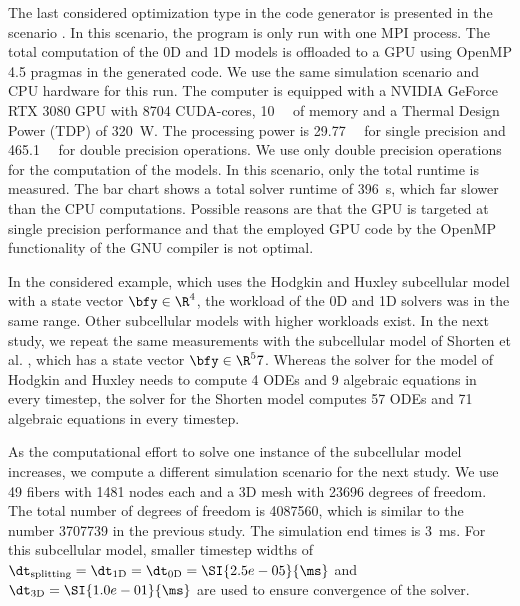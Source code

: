 The last considered optimization type in the code generator is presented in the scenario . In this scenario, the program is only run with one MPI process. The total computation of the 0D and 1D models is offloaded to a GPU using OpenMP 4.5 pragmas in the generated code. We use the same simulation scenario and CPU hardware for this run. The computer is equipped with a NVIDIA GeForce RTX 3080 GPU with 8704 CUDA-cores, \SI{10}{\giga\byte} of memory and a Thermal Design Power (TDP) of \SI{320}{\watt}. The processing power is \SI{29.77}{\tera\flops} for single precision and \SI{465.1}{\giga\flops} for double precision operations. We use only double precision operations for the computation of the models.
In this scenario, only the total runtime is measured. The bar chart shows a total solver runtime of \SI{396}{\s}, which far slower than the CPU computations. Possible reasons are that the GPU is targeted at single precision performance and that the employed GPU code by the OpenMP functionality of the GNU compiler is not optimal.

In the considered example, which uses the Hodgkin and Huxley subcellular model with a state vector $\bfy \in \R^4$, the workload of the 0D and 1D solvers was in the same range. Other subcellular models with higher workloads exist. In the next study, we repeat the same measurements with the subcellular model of Shorten et al. \cite{shorten2007mathematical}, which has a state vector $\bfy \in \R^57$.  Whereas the solver for the model of Hodgkin and Huxley needs to compute 4 ODEs and 9 algebraic equations in every timestep, the solver for the Shorten model computes 57 ODEs and 71 algebraic equations in every timestep.

As the computational effort to solve one instance of the subcellular model increases, we compute a different simulation scenario for the next study. 
We use 49 fibers with 1481 nodes each and a 3D mesh with \num{23696} degrees of freedom. The total number of degrees of freedom is \num{4087560}, which is similar to the number \num{3707739} in the previous study. The simulation end times is \SI{3}{\ms}. For this subcellular model, smaller timestep widths of $\dt_\text{splitting}=\dt_\text{1D}=\dt_\text{0D}=\SI{2.5e-05}{\ms}$ and $\dt_\text{3D}=\SI{1.0e-01}{\ms}$ are used to ensure convergence of the solver.


